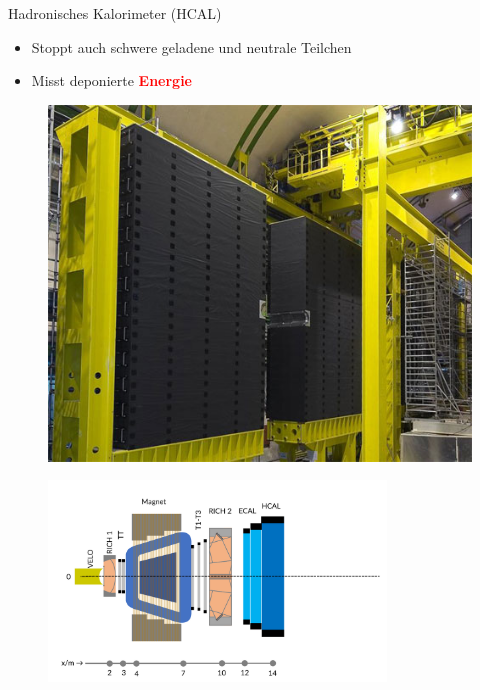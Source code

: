 \begin{frame}{Hadronisches Kalorimeter (HCAL)}
    \begin{minipage}{0.58\textwidth}
    \begin{itemize}
        \item Stoppt auch schwere geladene und neutrale Teilchen
        \item Misst deponierte \textcolor{red}{\textbf{Energie}}
    \end{itemize}
    \end{minipage}\hfill
    \begin{minipage}{0.38\textwidth}
        \begin{figure}[h]
        \centering
        \includegraphics[height=2.5 cm]{Figures Introductory Lecture/LHCb Detector/LHCb_HCAL.jpg}%
        \end{figure}
    \end{minipage}
    \vspace{-0.5cm}
    \begin{figure}[h]
    \centering
    \includegraphics[width=0.8\textwidth]{Figures Introductory Lecture/LHCb Detector/LHCb_8_DE.png}
    \end{figure}
\end{frame}
